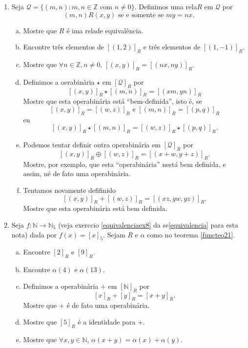 \begin{enumerate}[{\bf 1.}]
\noindent \textit{\textbf{``Contraexemplo'':}} Sejam $A=\{1,2\}$, $B=\{1,2,3\}$ e $f:A\to B$ dada por $f(1)=1$ e $f(2)=1$. Ent\ao
\[
f^{-1}\bola f=\{(\emptyset,\emptyset),(\{1\},\{1,2\}), (\{1,2\},\{1,2\}), (\{2\},\{1,2\})\},
\]
que \'e sim\'etrica mas n\ao reflexiva.

\item Seja $\mathcal{Q}=\{(m,n): m,n\in \mathbb{Z} \textrm{ com } n\neq 0\}$. Definimos uma rela\cao $R$ em $\mathcal{Q}$ por
\[
(m,n)R(x,y) \textrm { se e somente se } my=nx.
\]
\begin{enumerate}[a)]
\item Mostre que $R$ \'e ima rela\cao de equival\^encia.
\item Encontre tr\^es elementos de $[(1,2)]_R$ e tr\^es elementos de $[(1,-1)]_R$.
\item Mostre que $\forall n\in\mathbb{Z}, n\neq 0$, $[(x,y)]_R=[(nx,ny)]_R$.
\item Definimos a oera\cao bin\'aria $\star$ em $[\mathcal{Q}]_R$ por
\[
[(x,y)]_R\star [(m,n)]_R=[(xm,yn)]_R
\]
Mostre que esta opera\cao bin\'aria est\'a ``bem-definida'', isto \'e, se
\[
[(x,y)]_R=[(w,z)]_R \textrm{ e } [(m,n)]_R=[(p,q)]_R
\]
en\tao
\[
[(x,y)]_R\star[(m,n)]_R=[(w,z)]_R\star[(p,q)]_R.
\]
\item Podemos tentar definir outra opera\cao bin\'aria em $[\mathcal{Q}]_R$ por
\[
[(x,y)]_R\oplus[(w,z)]_R=[(x+w,y+z)]_R.
\]
Mostre, por exemplo, que esta ``opera\cao bin\'aria'' n\ao est\'a bem definida, e assim, n\ao \'e de fato uma opera\cao bin\'aria.
\item  Tentamos novamente defifinido
\[
[(x,y)]_R+[(w,z)]_R=[(xz,yw,yz)]_R.
\]
Mostre que esta opera\cao bin\'aria est\'a bem definida.
\end{enumerate}

\indent [Nota: O leitor alerta pode ter feito a identifica\cao de $\mathcal{Q}$ com $\mathbb{Q}$, o conjunto dos n\'umeros racionais, com $m,n$ fazendo o papel de $m/n$. De fato, o que pensamos ser o n\'umero $1/2$ \'e realmente uma classe de esquival\^encia e igauldade de n\'umeros racionais \'e igualdade de classe de equival\^encia. Por isso no ensino b\'asico aprendemos que $1/2=3/6$.]

\item Seja $f:\mathbb{N}\to\mathbb{N}_5$ (veja exerc\ih cio \ref{equivalenciaex8} da se\cao \ref{equivalencia} para esta nota\caoi) dada por $f(x)=[x]_5$. Sejam $R$ e $\alpha$ como no teorema \ref{functeo21}.
\begin{enumerate}[a)]
\item Encontre $[2]_R$ e $[9]_R$.
\item Encontre $\alpha(4)$ e $\alpha(13)$.
\item Definimos a opera\cao bin\'aria $+$ em $[\mathbb{N}]_R$ por
\[
[x]_R+[y]_R=[x+y]_R.
\]
Mostre que $+$ \'e de fato uma opera\cao bin\'aria.
\item Mostre que $[5]_R$ \'e a identidade para $+$.
\item Mostre que $\forall x,y\in \mathbb{N}$, $\alpha(x+y)=\alpha(x)+\alpha(y)$.
\end{enumerate}
\end{enumerate}
